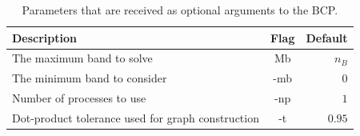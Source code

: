 \documentclass[a4paper,12pt]{report}
\begin{document}
\begin{appendices}
\begin{table}[H]
    \center
    \caption{Parameters that are received as optional arguments to the BCP.}\label{tab:options}
    \begin{tabular}{lcr}
        \hline
        Description & Flag & Default \\
        \hline
        The maximum band to solve  & Mb & $n_B$\\
        The minimum band to consider & -mb & $0$\\
        Number of processes to use & -np & $1$\\
        Dot-product tolerance used for graph construction & -t & $0.95$\\

        \hline
    \end{tabular}
\end{table}



\end{appendices}
\end{document}
